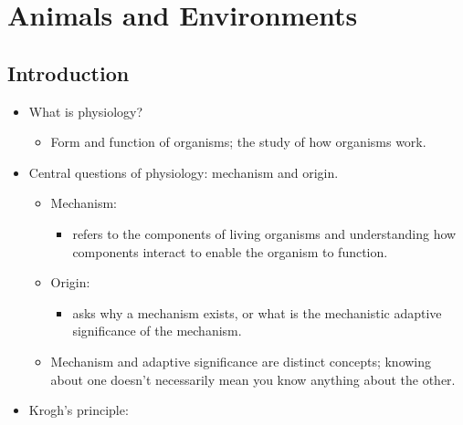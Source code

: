 \documentclass[12pt,a4paper]{article}
\begin{document}
\tableofcontents
\cleardoublepage
\fancyhead{}

\clearpage
{}
\clearpage
\section{Animals and Environments}
\subsection{Introduction}
\begin{itemize}
    \item What is physiology?
        \begin{itemize}
            \item Form and function of organisms; the study of how organisms work.
        \end{itemize}
    \item Central questions of physiology: {\color{o-Sun}mechanism} and {\color{o-Sun}origin}.
        \begin{itemize}
            \item Mechanism:
                \begin{itemize}
                    \item refers to the {\color{o-Sun}components} of living organisms and understanding {\color{o-Sun}how} components interact to enable the organism to function.
                \end{itemize}
            \item Origin:
                \begin{itemize}
                    \item asks why a mechanism exists, or {\color{o-Sun}what} is the mechanistic {\color{o-Sun}adaptive significance} of the mechanism.
                \end{itemize}
            \item Mechanism and adaptive significance are distinct concepts; knowing about one doesn't necessarily mean you know anything about the other.
        \end{itemize}
    \item Krogh's principle: \begin{quote}

\end{quote}
\end{itemize}
\end{document}
